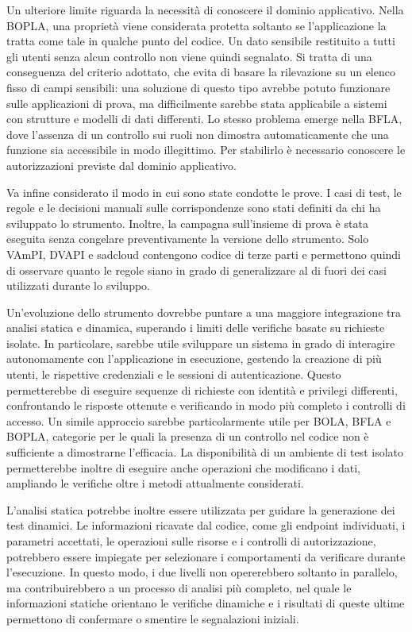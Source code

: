 Un ulteriore limite riguarda la necessità di conoscere il dominio applicativo. Nella BOPLA, una proprietà viene considerata protetta soltanto se l'applicazione la tratta come tale in qualche punto del codice. Un dato sensibile restituito a tutti gli utenti senza alcun controllo non viene quindi segnalato. Si tratta di una conseguenza del criterio adottato, che evita di basare la rilevazione su un elenco fisso di campi sensibili: una soluzione di questo tipo avrebbe potuto funzionare sulle applicazioni di prova, ma difficilmente sarebbe stata applicabile a sistemi con strutture e modelli di dati differenti. Lo stesso problema emerge nella BFLA, dove l'assenza di un controllo sui ruoli non dimostra automaticamente che una funzione sia accessibile in modo illegittimo. Per stabilirlo è necessario conoscere le autorizzazioni previste dal dominio applicativo.

Va infine considerato il modo in cui sono state condotte le prove. I casi di test, le regole e le decisioni manuali sulle corrispondenze sono stati definiti da chi ha sviluppato lo strumento. Inoltre, la campagna sull'insieme di prova è stata eseguita senza congelare preventivamente la versione dello strumento. Solo VAmPI, DVAPI e sadcloud contengono codice di terze parti e permettono quindi di osservare quanto le regole siano in grado di generalizzare al di fuori dei casi utilizzati durante lo sviluppo.

Un'evoluzione dello strumento dovrebbe puntare a una maggiore integrazione tra analisi statica e dinamica, superando i limiti delle verifiche basate su richieste isolate. In particolare, sarebbe utile sviluppare un sistema in grado di interagire autonomamente con l'applicazione in esecuzione, gestendo la creazione di più utenti, le rispettive credenziali e le sessioni di autenticazione. Questo permetterebbe di eseguire sequenze di richieste con identità e privilegi differenti, confrontando le risposte ottenute e verificando in modo più completo i controlli di accesso. Un simile approccio sarebbe particolarmente utile per BOLA, BFLA e BOPLA, categorie per le quali la presenza di un controllo nel codice non è sufficiente a dimostrarne l'efficacia. La disponibilità di un ambiente di test isolato permetterebbe inoltre di eseguire anche operazioni che modificano i dati, ampliando le verifiche oltre i metodi attualmente considerati.

L'analisi statica potrebbe inoltre essere utilizzata per guidare la generazione dei test dinamici. Le informazioni ricavate dal codice, come gli endpoint individuati, i parametri accettati, le operazioni sulle risorse e i controlli di autorizzazione, potrebbero essere impiegate per selezionare i comportamenti da verificare durante l'esecuzione. In questo modo, i due livelli non opererebbero soltanto in parallelo, ma contribuirebbero a un processo di analisi più completo, nel quale le informazioni statiche orientano le verifiche dinamiche e i risultati di queste ultime permettono di confermare o smentire le segnalazioni iniziali.

